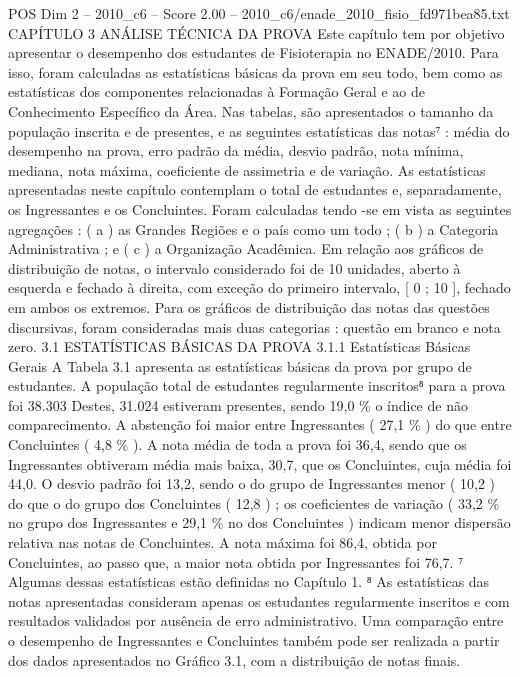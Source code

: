 \begin{textsample}{POS Dim 2 – 2010\_c6 – Score 2.00 – 2010\_c6/enade\_2010\_fisio\_fd971bea85.txt}  \label{ex:f2_pos_186}
CAPÍTULO 3 ANÁLISE TÉCNICA DA PROVA Este capítulo tem por objetivo apresentar o desempenho dos estudantes de Fisioterapia no ENADE/2010.
Para isso, foram calculadas as estatísticas básicas da prova em seu todo, bem como as estatísticas dos componentes relacionadas à Formação Geral e ao de Conhecimento Específico da Área.
Nas tabelas, são apresentados o tamanho da população inscrita e de presentes, e as seguintes estatísticas das notas⁷ : média do desempenho na prova, erro padrão da média, desvio padrão, nota mínima, mediana, nota máxima, coeficiente de assimetria e de variação.
As estatísticas apresentadas neste capítulo contemplam o total de estudantes e, separadamente, os Ingressantes e os Concluintes.
Foram calculadas tendo -se em vista as seguintes agregações : ( a ) as Grandes Regiões e o país como um todo ; ( b ) a Categoria Administrativa ; e ( c ) a Organização Acadêmica.
Em relação aos gráficos de distribuição de notas, o intervalo considerado foi de 10 unidades, aberto à esquerda e fechado à direita, com exceção do primeiro intervalo, [ 0 ; 10 ], fechado em ambos os extremos.
Para os gráficos de distribuição das notas das questões discursivas, foram consideradas mais duas categorias : questão em branco e nota zero. 3.1 ESTATÍSTICAS BÁSICAS DA PROVA 3.1.1 Estatísticas Básicas Gerais A Tabela 3.1 apresenta as estatísticas básicas da prova por grupo de estudantes.
A população total de estudantes regularmente inscritos⁸ para a prova foi 38.303 Destes, 31.024 estiveram presentes, sendo 19,0 \% o índice de não comparecimento.
A abstenção foi maior entre Ingressantes ( 27,1 \% ) do que entre Concluintes ( 4,8 \% ).
A nota média de toda a prova foi 36,4, sendo que os Ingressantes obtiveram média mais baixa, 30,7, que os Concluintes, cuja média foi 44,0.
O desvio padrão foi 13,2, sendo o do grupo de Ingressantes menor ( 10,2 ) do que o do grupo dos Concluintes ( 12,8 ) ; os coeficientes de variação ( 33,2 \% no grupo dos Ingressantes e 29,1 \% no dos Concluintes ) indicam menor dispersão relativa nas notas de Concluintes.
A nota máxima foi 86,4, obtida por Concluintes, ao passo que, a maior nota obtida por Ingressantes foi 76,7. ⁷ Algumas dessas estatísticas estão definidas no Capítulo 1. ⁸ As estatísticas das notas apresentadas consideram apenas os estudantes regularmente inscritos e com resultados validados por ausência de erro administrativo.
Uma comparação entre o desempenho de Ingressantes e Concluintes também pode ser realizada a partir dos dados apresentados no Gráfico 3.1, com a distribuição de notas finais.

\end{textsample}
